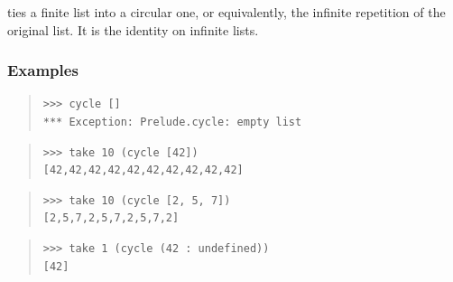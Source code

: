 \begin{haddockdesc}
\item[\begin{tabular}{@{}l}
cycle :: HasCallStack => {\char 91}a{\char 93} -> {\char 91}a{\char 93}
\end{tabular}]
{\haddockbegindoc
{} ties a finite list into a circular one, or equivalently,
 the infinite repetition of the original list.  It is the identity
 on infinite lists.\par
\subsubsection*{\textbf{Examples}}
\begin{quote}
{\haddockverb\begin{verbatim}
>>> cycle []
*** Exception: Prelude.cycle: empty list

\end{verbatim}}
\end{quote}
\begin{quote}
{\haddockverb\begin{verbatim}
>>> take 10 (cycle [42])
[42,42,42,42,42,42,42,42,42,42]

\end{verbatim}}
\end{quote}
\begin{quote}
{\haddockverb\begin{verbatim}
>>> take 10 (cycle [2, 5, 7])
[2,5,7,2,5,7,2,5,7,2]

\end{verbatim}}
\end{quote}
\begin{quote}
{\haddockverb\begin{verbatim}
>>> take 1 (cycle (42 : undefined))
[42]

\end{verbatim}}
\end{quote}}
\end{haddockdesc}
